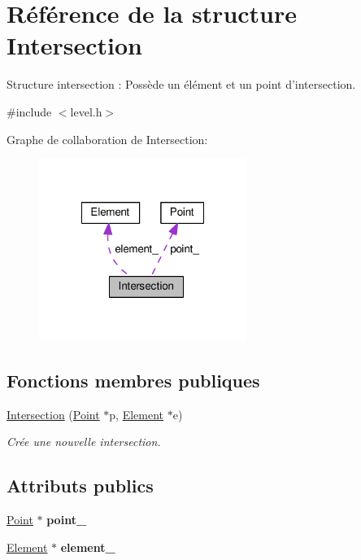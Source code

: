 \hypertarget{structIntersection}{\section{Référence de la structure Intersection}
\label{structIntersection}
}


Structure intersection \+: Possède un élément et un point d'intersection.  




{\ttfamily \#include $<$level.\+h$>$}



Graphe de collaboration de Intersection\+:
\nopagebreak
\begin{figure}[H]
\begin{center}
\leavevmode
\includegraphics[width=191pt]{d9/d8e/structIntersection__coll__graph}
\end{center}
\end{figure}
\subsection*{Fonctions membres publiques}
\begin{DoxyCompactItemize}
\item 
\hyperlink{structIntersection_a44d7ebd733fe15894a44f14a63c3d328}{Intersection} (\hyperlink{classPoint}{Point} $\ast$p, \hyperlink{classElement}{Element} $\ast$e)
\begin{DoxyCompactList}\small\item\em Crée une nouvelle intersection. \end{DoxyCompactList}\end{DoxyCompactItemize}
\subsection*{Attributs publics}
\begin{DoxyCompactItemize}
\item 
\hypertarget{structIntersection_ac914f236feced83128e4f542d21327b2}{\hyperlink{classPoint}{Point} $\ast$ {\bfseries point\+\_\+}}\label{structIntersection_ac914f236feced83128e4f542d21327b2}

\item 
\hypertarget{structIntersection_aae28864f0cb6a95503384a73c33ad4cd}{\hyperlink{classElement}{Element} $\ast$ {\bfseries element\+\_\+}}\label{structIntersection_aae28864f0cb6a95503384a73c33ad4cd}

\end{DoxyCompactItemize}


